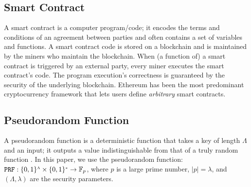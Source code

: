 \vspace{-3mm}

\subsection{Smart Contract}\label{subsec:SC}

\vspace{-1mm}



A smart contract is a computer program/code; it encodes the terms and conditions of an agreement between parties and often contains a set of variables and functions. A smart contract code is stored on a blockchain and is maintained by the miners who maintain the blockchain.  When (a function of) a smart contract is triggered by an external party, every miner executes the smart contract's code. The program execution’s correctness is guaranteed by the security of the underlying blockchain. Ethereum \cite{ethereum} has been the most predominant cryptocurrency framework that lets users define \emph{arbitrary} smart contracts. 




\vspace{-4mm}

\subsection{Pseudorandom Function}

\vspace{-1mm}

A pseudorandom function is a deterministic function that takes a key of length $\Lambda$ and an input; it outputs a value  indistinguishable from that of  a truly random function \cite{DBLP:books/crc/KatzLindell2014}.  In this paper, we use the pseudorandom function:   $\mathtt {PRF}: \{0,1\}^{\scriptscriptstyle \Lambda}\times \{0,1\}^{\scriptscriptstyle *} \rightarrow  \mathbb{F}_p$, where $p$ is a large prime number, $|p|=\lambda$, and $(\Lambda,\lambda)$ are the security parameters. %

